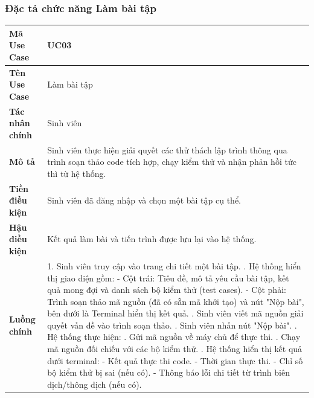 \documentclass[../main.tex]{subfiles}
\begin{document}
\subsubsection{Đặc tả chức năng Làm bài tập}


{
\renewcommand{\arraystretch}{1.5}
\begin{tabularx}{\textwidth}{|p{3.5cm}|X|}
\caption{Bảng đặc tả chức năng Làm bài tập}
\label{tab:bang-dac-ta-chuc-nang-lam-bai-tap}
\\
\hline
\textbf{Mã Use Case} & UC03 \\
\hline
\textbf{Tên Use Case} & Làm bài tập \\
\hline
\textbf{Tác nhân chính} & Sinh viên \\
\hline
\textbf{Mô tả} & Sinh viên thực hiện giải quyết các thử thách lập trình thông qua trình soạn thảo code tích hợp, chạy kiểm thử và nhận phản hồi tức thì từ hệ thống. \\
\hline
\textbf{Tiền điều kiện} & Sinh viên đã đăng nhập và chọn một bài tập cụ thể. \\
\hline
\textbf{Hậu điều kiện} & Kết quả làm bài và tiến trình được lưu lại vào hệ thống. \\
\hline
\textbf{Luồng chính} & 1. Sinh viên truy cập vào trang chi tiết một bài tập. \newline 2. Hệ thống hiển thị giao diện gồm: \newline - Cột trái: Tiêu đề, mô tả yêu cầu bài tập, kết quả mong đợi và danh sách bộ kiểm thử (test cases). \newline - Cột phải: Trình soạn thảo mã nguồn (đã có sẵn mã khởi tạo) và nút "Nộp bài", bên dưới là Terminal hiển thị kết quả. \newline 3. Sinh viên viết mã nguồn giải quyết vấn đề vào trình soạn thảo. \newline 4. Sinh viên nhấn nút "Nộp bài". \newline 5. Hệ thống thực hiện: \newline 5.1. Gửi mã nguồn về máy chủ để thực thi. \newline 5.2. Chạy mã nguồn đối chiếu với các bộ kiểm thử. \newline 6. Hệ thống hiển thị kết quả dưới terminal: \newline - Kết quả thực thi code. \newline - Thời gian thực thi. \newline - Chỉ số bộ kiểm thử bị sai (nếu có). \newline - Thông báo lỗi chi tiết từ trình biên dịch/thông dịch (nếu có). \\

\end{tabularx}}
\end{document}
